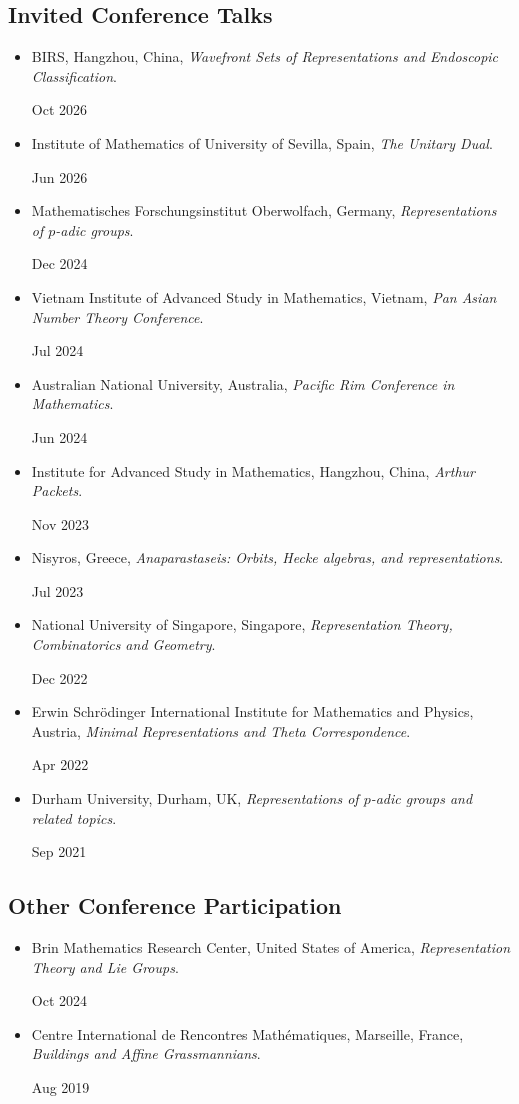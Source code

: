 \documentclass[11pt]{article}
\newcommand{\dateditem}[2]{\Needspace{3\baselineskip}\item
  \begin{minipage}[t]{\dimexpr\linewidth-1.2in\relax}\raggedright #1\end{minipage}\hfill
  \begin{minipage}[t]{1.05in}\raggedleft #2\end{minipage}}
\begin{document}
\subsection*{Invited Conference Talks}
\begin{itemize}
\dateditem{BIRS, Hangzhou, China, \textit{Wavefront Sets of Representations and Endoscopic Classification}.}{Oct 2026}
\dateditem{Institute of Mathematics of University of Sevilla, Spain, \textit{The Unitary Dual}.}{Jun 2026}
\dateditem{Mathematisches Forschungsinstitut Oberwolfach, Germany, \textit{Representations of $p$-adic groups}.}{Dec 2024}
\dateditem{Vietnam Institute of Advanced Study in Mathematics, Vietnam, \textit{Pan Asian Number Theory Conference}.}{Jul 2024}
\dateditem{Australian National University, Australia, \textit{Pacific Rim Conference in Mathematics}.}{Jun 2024}
\dateditem{Institute for Advanced Study in Mathematics, Hangzhou, China, \textit{Arthur Packets}.}{Nov 2023}
\dateditem{Nisyros, Greece, \textit{Anaparastaseis: Orbits, Hecke algebras, and representations}.}{Jul 2023}
\dateditem{National University of Singapore, Singapore, \textit{Representation Theory, Combinatorics and Geometry}.}{Dec 2022}
\dateditem{Erwin Schr{\"o}dinger International Institute for Mathematics and Physics, Austria, \textit{Minimal Representations and Theta Correspondence}.}{Apr 2022}
\dateditem{Durham University, Durham, UK, \textit{Representations of $p$-adic groups and related topics}.}{Sep 2021}
\end{itemize}


\subsection*{Other Conference Participation}
\begin{itemize}
\dateditem{Brin Mathematics Research Center, United States of America, \textit{Representation Theory and Lie Groups}.}{Oct 2024}
\dateditem{Centre International de Rencontres Mathématiques, Marseille, France, \textit{Buildings and Affine Grassmannians}.}{Aug 2019}
\end{itemize}
\end{document}
